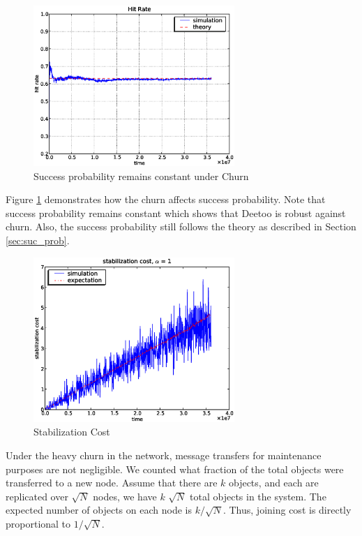 \documentclass[conference]{IEEEtran}
\begin{document}
\begin{figure}
\centering
\includegraphics[width=3in]{hit_ch}
\caption{Success probability remains constant under Churn} \label{fig:hit_churn}
\end{figure}
Figure \ref{fig:hit_churn} demonstrates how the churn affects success probability.
Note that success probability remains constant which shows that Deetoo is robust against churn. 
Also, the success probability still follows the theory as described in Section \ref{sec:suc_prob}.

\begin{figure}
\centering
\includegraphics[width=3in]{stab_cost}
\caption{Stabilization Cost} \label{fig:stab_cost}
\end{figure}
Under the heavy churn in the network, message transfers for maintenance purposes
are not negligible. 
We counted what fraction of the total objects were transferred to a new node.
Assume that there are $k$ objects, and each are replicated over 
$\sqrt{N}$ nodes, we have $k$ $\sqrt{N}$ total objects in the system.
The expected number of objects on each node is $k/\sqrt{N}$. 
Thus, joining cost is directly proportional to $1/\sqrt{N}$.
\end{document}
